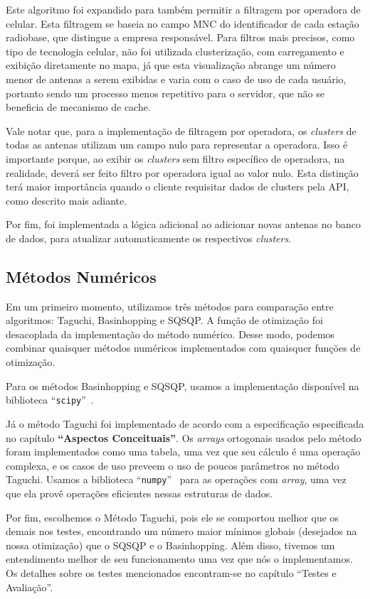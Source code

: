 \documentclass[]{politex}
\begin{document}
Este algoritmo foi expandido para também permitir a filtragem por operadora de
celular. Esta filtragem se baseia no campo MNC do identificador de cada estação
radiobase, que distingue a empresa responsável. Para filtros mais precisos, como
tipo de tecnologia celular, não foi utilizada clusterização, com carregamento e
exibição diretamente no mapa, já que esta visualização abrange um número menor
de antenas a serem exibidas e varia com o caso de uso de cada usuário, portanto
sendo um processo menos repetitivo para o servidor, que não se beneficia de
mecanismo de cache.

Vale notar que, para a implementação de filtragem por operadora, os
\textit{clusters} de todas as antenas utilizam um campo nulo para representar a
operadora. Isso é importante porque, ao exibir os \textit{clusters} sem filtro
específico de operadora, na realidade, deverá ser feito filtro por operadora
igual ao valor nulo. Esta distinção terá maior importância quando o cliente
requisitar dados de clusters pela API, como descrito mais adiante.

Por fim, foi implementada a lógica adicional ao adicionar novas antenas no banco
de dados, para atualizar automaticamente os respectivos \textit{clusters}.

\subsection{Métodos Numéricos}

Em um primeiro momento, utilizamos três métodos para comparação entre
algoritmos: Taguchi, Basinhopping e SQSQP. A função de otimização foi
desacoplada da implementação do método numérico. Desse modo, podemos combinar
quaisquer métodos numéricos implementados com quaisquer funções de otimização.

Para os métodos Basinhopping e SQSQP, usamos a implementação disponível na
biblioteca ``\texttt{scipy}''~\cite{scipy}.

Já o método Taguchi foi implementado de acordo com a especificação especificada
no capítulo \textbf{``Aspectos Conceituais''}. Os \textit{arrays} ortogonais
usados pelo método foram implementados como uma tabela, uma vez que seu cálculo
é uma operação complexa, e os casos de uso preveem o uso de poucos parâmetros no
método Taguchi. Usamos a biblioteca ``\texttt{numpy}''~\cite{numpy} para as
operações com \textit{array}, uma vez que ela provê operações eficientes nessas
estruturas de dados.

Por fim, escolhemos o Método Taguchi, pois ele se comportou melhor que os demais
nos testes, encontrando um número maior mínimos globais (desejados na nossa
otimização) que o SQSQP e o Basinhopping. Além disso, tivemos um entendimento
melhor de seu funcionamento uma vez que nós o implementamos. Os detalhes sobre
os testes mencionados encontram-se no capítulo ``Testes e Avaliação''.
\end{document}
